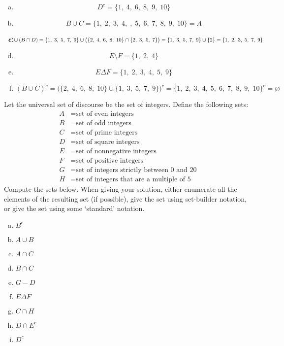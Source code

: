 \documentclass[11pt,letterpaper]{article}
\begin{document}
\sol
\begin{enumerate}[(a)]
\item 
	\[
	D^c= \{ 1,\; 4,\; 6,\; 8,\; 9,\; 10 \} 
	\]

\item 
	\[
	B \cup C= \{ 1,\; 2,\; 3,\; 4,\; ,\; 5,\; 6,\; 7,\; 8,\; 9,\; 10 \}= A
	\]

\item 
	\[
	\hspace{-0.5cm} C \cup (B \cap D)= \{ 1,\; 3,\; 5,\; 7,\; 9 \} \cup \big( \{ 2,\; 4,\; 6,\; 8,\; 10 \} \cap \{ 2,\; 3,\; 5,\; 7 \} \big)= \{ 1,\; 3,\; 5,\; 7,\; 9 \} \cup \{ 2 \}= \{ 1,\; 2,\; 3,\; 5,\; 7,\; 9 \} 
	\]

\item 
	\[
	E \setminus F= \{ 1,\; 2,\; 4 \} 
	\]

\item 
	\[
	E \Delta F= \{ 1,\; 2,\; 3,\; 4,\; 5,\; 9 \}
	\]

\item  
	\[
	(B \cup C)^c= \big( \{ 2,\; 4,\; 6,\; 8,\; 10 \} \cup \{ 1,\; 3,\; 5,\; 7,\; 9 \} \big)^c= \{ 1,\; 2,\; 3,\; 4,\; 5,\; 6,\; 7,\; 8,\; 9,\; 10 \}^c= \varnothing
	\]
\end{enumerate}



\newpage



 Let the universal set of discourse be the set of integers. Define the following sets:
	\[
	\begin{aligned}
	A&= \text{set of even integers} \\
	B&= \text{set of odd integers} \\
	C&= \text{set of prime integers} \\
	D&= \text{set of square integers} \\
	E&= \text{set of nonnegative integers} \\
	F&= \text{set of positive integers} \\
	G&= \text{set of integers strictly between 0 and 20} \\
	H&= \text{set of integers that are a multiple of 5}
	\end{aligned}
	\]
Compute the sets below. When giving your solution, either enumerate all the elements of the resulting set (if possible), give the set using set-builder notation, or give the set using some `standard' notation. 
	\begin{enumerate}[(a)]
	\item $B^c$
	\item $A \cup B$
	\item $A \cap C$
	\item $B \cap C$
	\item $G - D$	
	\item $E \Delta F$
	\item $C \cap H$
	\item $D \cap E^c$
	\item $D^c$
	\end{enumerate} \pspace
\end{document}
